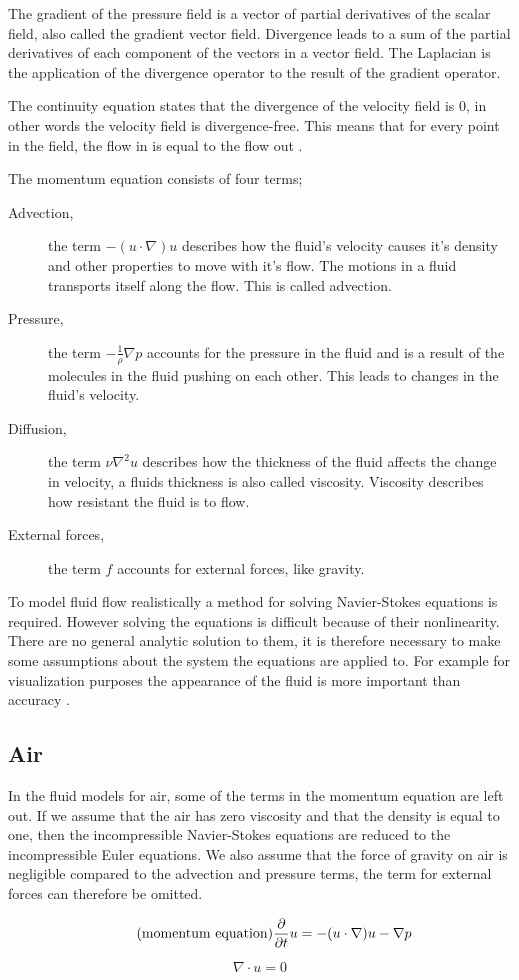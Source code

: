 The gradient of the pressure field is a vector of partial derivatives of the 
scalar field, also called the gradient vector field. Divergence leads to a sum of 
the partial derivatives of each component of the vectors in a vector field. The 
Laplacian is the application of the divergence operator to the result of the gradient 
operator. 

The continuity equation states that the divergence of the 
velocity field is 0, in other words the velocity field is divergence-free. This 
means that for every point in the field, the flow in is equal to the flow out
\cite{originalSnowThesis}. 

The momentum equation consists of four terms;
\begin{description}
	\item[Advection,] the term $-(u \cdot \nabla)u$ describes how the fluid's 
	velocity causes it's density and other properties to move with it's flow. 
	The motions in a fluid transports itself along the flow. This is called 
	advection. 
	\item[Pressure,] the term $-\frac{1}{\rho}\nabla p$ accounts for the pressure 
	in the fluid and is a result of the molecules in the fluid pushing on each 
	other. This leads to changes in the fluid's velocity. 
	\item[Diffusion,] the term $\nu \nabla^2 u$ describes how the thickness of the 
	fluid affects the change in velocity, a fluids thickness is also called viscosity. 
	Viscosity describes how resistant the fluid is to flow. 
	\item[External forces,] the term $f$ accounts for external forces, like gravity.
\end{description}

To model fluid flow realistically a method for solving Navier-Stokes equations is 
required. However solving the equations is difficult because of their nonlinearity. 
There are no general analytic solution to them, it is therefore necessary to make 
some assumptions about the system the equations are applied to. For example for 
visualization purposes the appearance of the fluid is more important than accuracy 
\cite{smokeAndFire}. 

\subsection{Air}

In the fluid models for air, some of the terms in the momentum equation are left 
out. If we assume that the air has zero viscosity and that the density is equal 
to one, then the incompressible Navier-Stokes equations are reduced to the incompressible 
Euler equations. We also assume that the force of gravity on air is negligible 
compared to the advection and pressure terms, the term for external forces can 
therefore be omitted\cite{originalSnowThesis}. 

\begin{equation} 
	\tag{momentum equation}
	\frac{\partial}{\partial t}u  = -(u \cdot \nabla)u - \nabla p
\end{equation}

\begin{equation}
	\tag{continuity equation}
	\nabla \cdot u = 0
\end{equation}
